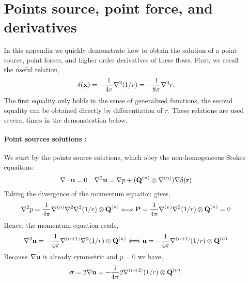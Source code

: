 




\section{Points source, point force, and derivatives}
\label{ap:singularity_sol}
In this appendix we quickly demonstrate how to obtain the solution of a point source, point forces, and higher order derivatives of these flows. 
First, we recall the useful relation, 
\begin{equation}
    \delta(\textbf{x})
    =-\frac{1}{4\pi}\grad^2(1/r)
    =-\frac{1}{8\pi}\grad^4r.
    \label{eq:usefuk_rel}
\end{equation}
The first equality only holds in the sense of generalized functions, the second equality can be obtained directly by differentiation of $r$. 
These relations are used several times in the demonstration below. 

\paragraph{Point sources solutions :}
We start by the points source solutions, which obey the non-homogeneous Stokes equaitons: 
\begin{align}
    \mathbf{\nabla}\cdot\textbf{u}= 0 
    &&
    \mathbf{\nabla}^2\textbf{u}=\mathbf{\nabla} p+ (\textbf{Q}^{(n)}\otimes \mathbf{\nabla}^{(n)})\mathbf{\nabla}\delta(\textbf{r})
\end{align}
Taking the divergence of the momentum equation gives,
\begin{align}
    \mathbf{\nabla}^2 p = \frac{1}{4\pi}\mathbf{\nabla}^{(n)}\mathbf{\nabla}^2 \mathbf{\nabla}^2(1/r) \otimes\textbf{Q}^{(n)}
    \Longleftrightarrow
    \textbf{P} = \frac{1}{4\pi}\mathbf{\nabla}^{(n)}\mathbf{\nabla}^2(1/r)\otimes\textbf{Q}^{(n)} = 0 
\end{align}
Hence, the momentum equation reads, 
\begin{equation}
    \grad^2\textbf{u}= -\frac{1}{4\pi } \grad^{(n+1)} \grad^2 (1/r) \otimes\textbf{Q}^{(n)}
    \Longleftrightarrow
    \textbf{u}= - \frac{1}{4\pi }\grad^{(n+1)}(1/r)\otimes\textbf{Q}^{(n)}
    \label{eq:pts_source}
\end{equation}
Because $\mathbf{\nabla}\textbf{u}$ is already symmetric and $p=0$ we have, 
\begin{equation}
    \bm\sigma = 2\mathbf{\nabla} \textbf{u}=- \frac{1}{4\pi }2 \mathbf{\nabla}^{(n+2)}(1/r)\otimes \textbf{Q}^{(n)}. 
\end{equation}
